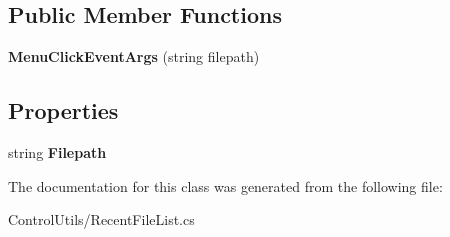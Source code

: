 \subsection*{Public Member Functions}
\begin{DoxyCompactItemize}
\item 
{\bfseries Menu\+Click\+Event\+Args} (string filepath)\hypertarget{class_power_system_planning_wpf_app_1_1_control_utils_1_1_recent_file_list_1_1_menu_click_event_args_a4b59a33fb4c05bb796ebe23cf50e1695}{}\label{class_power_system_planning_wpf_app_1_1_control_utils_1_1_recent_file_list_1_1_menu_click_event_args_a4b59a33fb4c05bb796ebe23cf50e1695}

\end{DoxyCompactItemize}
\subsection*{Properties}
\begin{DoxyCompactItemize}
\item 
string {\bfseries Filepath}\hypertarget{class_power_system_planning_wpf_app_1_1_control_utils_1_1_recent_file_list_1_1_menu_click_event_args_a5dd55be771936c2222924eda6e5bf465}{}\label{class_power_system_planning_wpf_app_1_1_control_utils_1_1_recent_file_list_1_1_menu_click_event_args_a5dd55be771936c2222924eda6e5bf465}

\end{DoxyCompactItemize}


The documentation for this class was generated from the following file\+:\begin{DoxyCompactItemize}
\item 
Control\+Utils/Recent\+File\+List.\+cs\end{DoxyCompactItemize}
